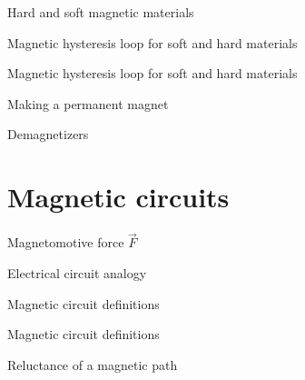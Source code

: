 \documentclass[compress]{beamer}
\begin{document}
{
    \begin{frame}{Hard and soft magnetic materials}
    \end{frame}
}

{
    \begin{frame}{Magnetic hysteresis loop for soft and hard materials}
    \end{frame}
}

{
    \begin{frame}{Magnetic hysteresis loop for soft and hard materials}
    \end{frame}
}

{
    \begin{frame}{Making a permanent magnet}
    \end{frame}
}


{
    \begin{frame}{Demagnetizers}
    \end{frame}
}

\section{Magnetic circuits}

{
    \begin{frame}{Magnetomotive force $\vec{F}$}
    \end{frame}
}

{
    \begin{frame}{Electrical circuit analogy}
    \end{frame}
}

{
    \begin{frame}{Magnetic circuit definitions}
    \end{frame}
}

{
    \begin{frame}{Magnetic circuit definitions}
    \end{frame}
}

{
    \begin{frame}{Reluctance of a magnetic path}
    \end{frame}
}
\end{document}
